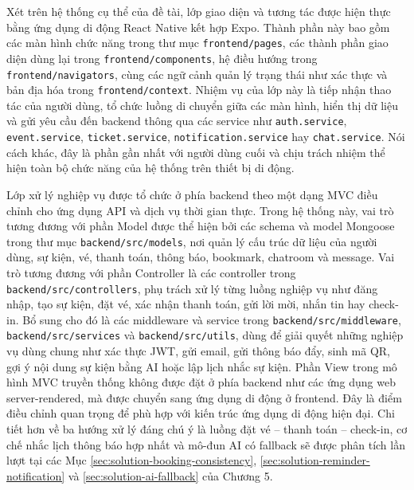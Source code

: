 \documentclass[../DoAn.tex]{subfiles}
\begin{document}
Xét trên hệ thống cụ thể của đề tài, lớp giao diện và tương tác được hiện thực bằng ứng dụng di động React Native kết hợp Expo. Thành phần này bao gồm các màn hình chức năng trong thư mục \texttt{frontend/pages}, các thành phần giao diện dùng lại trong \texttt{frontend/components}, hệ điều hướng trong \texttt{frontend/navigators}, cùng các ngữ cảnh quản lý trạng thái như xác thực và bản địa hóa trong \texttt{frontend/context}. Nhiệm vụ của lớp này là tiếp nhận thao tác của người dùng, tổ chức luồng di chuyển giữa các màn hình, hiển thị dữ liệu và gửi yêu cầu đến backend thông qua các service như \texttt{auth.service}, \texttt{event.service}, \texttt{ticket.service}, \texttt{notification.service} hay \texttt{chat.service}. Nói cách khác, đây là phần gần nhất với người dùng cuối và chịu trách nhiệm thể hiện toàn bộ chức năng của hệ thống trên thiết bị di động.

Lớp xử lý nghiệp vụ được tổ chức ở phía backend theo một dạng \gls{MVC} điều chỉnh cho ứng dụng \gls{API} và dịch vụ thời gian thực. Trong hệ thống này, vai trò tương đương với phần Model được thể hiện bởi các schema và model Mongoose trong thư mục \texttt{backend/src/models}, nơi quản lý cấu trúc dữ liệu của người dùng, sự kiện, vé, thanh toán, thông báo, bookmark, chatroom và message. Vai trò tương đương với phần Controller là các controller trong \texttt{backend/src/controllers}, phụ trách xử lý từng luồng nghiệp vụ như đăng nhập, tạo sự kiện, đặt vé, xác nhận thanh toán, gửi lời mời, nhắn tin hay check-in. Bổ sung cho đó là các middleware và service trong \texttt{backend/src/middleware}, \texttt{backend/src/services} và \texttt{backend/src/utils}, dùng để giải quyết những nghiệp vụ dùng chung như xác thực \gls{JWT}, gửi email, gửi thông báo đẩy, sinh mã \gls{QR}, gợi ý nội dung sự kiện bằng \gls{AI} hoặc lập lịch nhắc sự kiện. Phần View trong mô hình MVC truyền thống không được đặt ở phía backend như các ứng dụng web server-rendered, mà được chuyển sang ứng dụng di động ở frontend. Đây là điểm điều chỉnh quan trọng để phù hợp với kiến trúc ứng dụng di động hiện đại. Chi tiết hơn về ba hướng xử lý đáng chú ý là luồng đặt vé -- thanh toán -- check-in, cơ chế nhắc lịch thông báo hợp nhất và mô-đun AI có fallback sẽ được phân tích lần lượt tại các Mục \ref{sec:solution-booking-consistency}, \ref{sec:solution-reminder-notification} và \ref{sec:solution-ai-fallback} của Chương 5.
\end{document}
